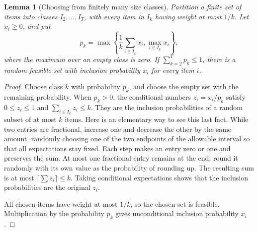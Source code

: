\documentclass[11pt]{article}
\newtheorem{lemma}[theorem]{Lemma}
\theoremstyle{definition}\newtheorem{algorithm}{Algorithm}[section]
\numberwithin{equation}{section}
\theoremstyle{remark}\newtheorem*{remark}{Remark}
\begin{document}
\begin{lemma}[Choosing from finitely many size classes]
\label{lem:bp-classchoice}
Partition a finite set of items into classes $I_2,\ldots,I_T$, with
every item in $I_k$ having weight at most $1/k$. Let $x_i\ge0$, and
put
\[
 p_k=\max\left\{\frac1k\sum_{i\in I_k}x_i,
                       \max_{i\in I_k}x_i\right\},
\]
where the maximum over an empty class is zero. If $\sum_{k=2}^Tp_k\le1$,
there is a random feasible set with inclusion probability $x_i$ for
every item $i$.
\end{lemma}
\begin{proof}
Choose class $k$ with probability $p_k$, and choose the empty set with
the remaining probability. When $p_k>0$, the conditional numbers
$z_i=x_i/p_k$ satisfy $0\le z_i\le1$ and $\sum_{i\in I_k}z_i\le k$.
They are the inclusion probabilities of a random subset of at most
$k$ items. Here is an elementary way to see this last fact. While two
entries are fractional, increase one and decrease the other by the
same amount, randomly choosing one of the two endpoints of the
allowable interval so that all expectations stay fixed. Each step
makes an entry zero or one and preserves the sum. At most one fractional
entry remains at the end; round it randomly with its own value as the
probability of rounding up. The resulting sum is at most
$\lceil\sum z_i\rceil\le k$. Taking conditional expectations shows
that the inclusion probabilities are the original $z_i$.

All chosen items have weight at most $1/k$, so the chosen set is
feasible. Multiplication by the probability $p_k$ gives unconditional
inclusion probability $x_i$.
\end{proof}
\end{document}

